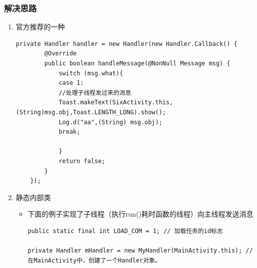 \documentclass[9pt, b5paper]{article}
\begin{document}
\subsubsection{解决思路}
\label{sec-2-1-1}
\begin{enumerate}
\item 官方推荐的一种
\label{sec-2-1-1-1}
\begin{verbatim}
private Handler handler = new Handler(new Handler.Callback() {
        @Override
        public boolean handleMessage(@NonNull Message msg) {
            switch (msg.what){
            case 1:
            //处理子线程发过来的消息
            Toast.makeText(SixActivity.this,(String)msg.obj,Toast.LENGTH_LONG).show();
            Log.d("aa",(String) msg.obj);
            break;

            }
            return false;
        }
    });
\end{verbatim}
\item 静态内部类
\label{sec-2-1-1-2}
\begin{itemize}
\item 下面的例子实现了子线程（执行run()耗时函数的线程）向主线程发送消息
\begin{verbatim}
public static final int LOAD_COM = 1; // 加载任务的id标志

private Handler mHandler = new MyHandler(MainActivity.this); // 在MainActivity中，创建了一个Handler对象。


\end{verbatim}
\end{itemize}
\end{enumerate}
\end{document}
